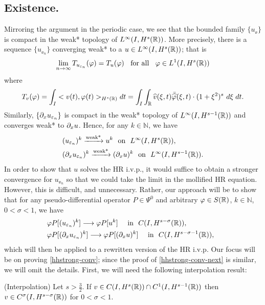 \subsection{Existence.}
Mirroring the argument in the periodic case, we see that the bounded
family $\{u_\ee\}$ is compact in the weak* topology of $L^\infty(I,
H^{s}(\mathbb{R}))$. More precisely, there is a sequence  $\{ u_{\ee_n} \}$
converging weak* to a $ u\in L^{\infty}(I, H^s(\mathbb{R}))$; that is 
		\begin{equation*}
			\label{hhweak-conv}
			\lim_{n\to \infty} T_{u_{\varepsilon_n}}(\varphi)  =  T_u (\varphi) 
			\; \;		
			\text{ for all } \;\;  \varphi \in L^1(I, H^{s}(\mathbb{R}))
		\end{equation*}
		where
		\begin{equation}
			T_v(\varphi) = \int_I <v (t), \varphi (t)>_{H^s(\mathbb{R})} dt  = \int_I
			 \int_{\mathbb{R}}
			 \widehat{v}(\xi, t) \bar{\widehat{\varphi}} (\xi, t) \cdot (1 +
			 \xi^2)^s \ d \xi \; dt.
		\end{equation}
		Similarly, $\left\{ \partial_x u_{\varepsilon_n} \right\}$ is compact in the
		weak* topology of $L^\infty(I, H^{s-1}(\mathbb{R}))$ and converges weak*
		to $\partial_x u$. Hence, for any $k \in \mathbb{N}$, we have
		\begin{align}
			\label{base-weak}
				& (u_{\varepsilon_n})^k \xrightarrow{\text{weak*}} u^k \ \
				\text{on} \ \
				L^\infty(I, H^s(\mathbb{R})),
				\\
				\label{base-weak-2}
				& (\partial_x u_{\varepsilon_n})^k \xrightarrow{\text{weak*}} (\partial_x u)^k
				\ \ \text{on} \ \
				L^\infty(I, H^{s-1}(\mathbb{R})). 
		\end{align}
		In order to show that $u$ solves the HR i.v.p., it would
		suffice to obtain a stronger convergence for  $u_{\ee_n}$ so that 
		we could take the limit in the mollified HR equation. However,
		this is difficult, and unnecessary. Rather, our approach will be to
		show that for any pseudo-differential operator
		$P \in \Psi^0$ and arbitrary $\varphi \in S(\mathbb{R})$, $k \in
		\mathbb{N}$, $0< \sigma < 1$, we have
			\begin{align}
			\label{hhstrong-conv}
			& \varphi P [(u_{\ee_n})^k] \longrightarrow \varphi P [u^k]  
			\quad
			\text{ in } \,\,   C(I, H^{s-\sigma}(\rr)), \ \,
			\\
			\label{hhstrong-conv-next}
			& \varphi P [(\p_x u_{\ee_n})^k] \longrightarrow \varphi P
			[(\p_x u)^k]  
			\quad
			\text{ in } \,\,   C(I, H^{s-\sigma -1}(\rr)), \ \ 
		\end{align}
		which will then be applied to a rewritten version of the HR
		i.v.p. Our focus will be on proving \eqref{hhstrong-conv}; since the proof of
		\eqref{hhstrong-conv-next} is similar, we will omit the
		details. First, we will need the following
		interpolation result:
		\begin{lemma}
			\label{hhinterpolation-lem}
			(Interpolation)     Let  $s > \frac{3}{2}$.
			If $v \in C(I, H^s(\mathbb{R})) \cap C^1(I, H^{s-1}(\mathbb{R}))$
			then $v \in C^\sigma (I, H^{s- \sigma}(\mathbb{R}))$ for  $0 < \sigma < 1$.
		\end{lemma}
